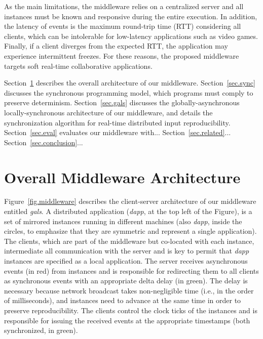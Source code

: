 \documentclass[sigplan,screen]{acmart}
\begin{document}
As the main limitations, the middleware relies on a centralized server and all
instances must be known and responsive during the entire execution.
In addition, the latency of events is the maximum round-trip time (RTT)
considering all clients, which can be intolerable for low-latency applications
such as video games.
Finally, if a client diverges from the expected RTT, the application may
experience intermittent freezes.
For these reasons, the proposed middleware targets soft real-time collaborative
applications.

Section~\ref{sec.arch} describes the overall architecture of our middleware.
Section~\ref{sec.sync} discusses the synchronous programming model, which
programs must comply to preserve determinism.
Section~\ref{sec.gals} discusses the globally-asynchronous locally-synchronous
architecture of our middleware, and details the synchronization algorithm for
real-time distributed input reproducibility.
Section~\ref{sec.eval} evaluates our middleware with...
Section~\ref{sec.related}...
Section~\ref{sec.conclusion}...

\section{Overall Middleware Architecture}
\label{sec.arch}

Figure~\ref{fig.middleware} describes the client-server architecture of our
middleware entitled \emph{gals}.
A distributed application (\emph{dapp}, at the top left of the Figure), is a
set of mirrored instances running in different machines (also \emph{dapp},
inside the circles, to emphasize that they are symmetric and represent a single
application).
The clients, which are part of the middleware but co-located with each
instance, intermediate all communication with the server and is key to permit
that \emph{dapp} instances are specified as a local application.
The server receives asynchronous events (in red) from instances and is
responsible for redirecting them to all clients as synchronous events with an
appropriate delta delay (in green).
The delay is necessary because network broadcast takes non-negligible time
(i.e., in the order of milliseconds), and instances need to advance at the same
time in order to preserve reproducibility.
The clients control the clock ticks of the instances and is responsible for
issuing the received events at the appropriate timestamps (both synchronized,
in green).
\end{document}
